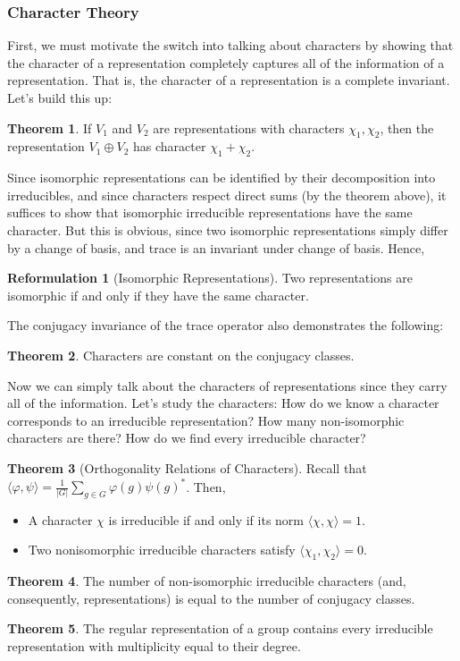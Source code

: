 \documentclass{article}
\theoremstyle{definition}
\newtheorem{reformulation}{Reformulation}[section]
\newtheorem{theorem}{Theorem}[section]
\begin{document}
\subsubsection*{Character Theory}
First, we must motivate the switch into talking about characters by showing that the character of a representation completely captures all of the information of a representation. That is, the character of a representation is a complete invariant. Let's build this up:
\begin{theorem}
    If $V_1$ and $V_2$ are representations with characters $\chi_1, \chi_2$, then the representation $V_1\oplus V_2$ has character $\chi_1+\chi_2$.
\end{theorem}
Since isomorphic representations can be identified by their decomposition into irreducibles, and since characters respect direct sums (by the theorem above), it suffices to show that isomorphic irreducible representations have the same character. But this is obvious, since two isomorphic representations simply differ by a change of basis, and trace is an invariant under change of basis. Hence,
\begin{reformulation}[Isomorphic Representations]
    Two representations are isomorphic if and only if they have the same character.
\end{reformulation}
The conjugacy invariance of the trace operator also demonstrates the following:
\begin{theorem}
    Characters are constant on the conjugacy classes.
\end{theorem}
Now we can simply talk about the characters of representations since they carry all of the information. Let's study the characters: How do we know a character corresponds to an irreducible representation? How many non-isomorphic characters are there? How do we find every irreducible character?
\begin{theorem}[Orthogonality Relations of Characters]
    Recall that $\langle \varphi, \psi \rangle= \frac1{|G|}\sum_{g\in G}^{} \varphi(g)\psi(g)^*$. Then, 
    \begin{itemize}
        \item A character $\chi$ is irreducible if and only if its norm $\langle \chi, \chi \rangle =1$.
        \item Two nonisomorphic irreducible characters satisfy $\langle \chi_1,\chi_2 \rangle=0$. 
    \end{itemize}
\end{theorem}
\begin{theorem}
    The number of non-isomorphic irreducible characters (and, consequently, representations) is equal to the number of conjugacy classes.
\end{theorem}
\begin{theorem}
    The regular representation of a group contains every irreducible representation with multiplicity equal to their degree.
\end{theorem}
\end{document}
